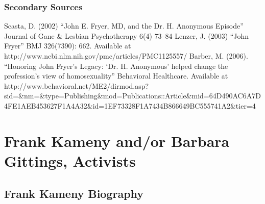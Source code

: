 \subsection{Secondary Sources}
\label{secondarysources}

Scasta, D. (2002) “John E. Fryer, MD, and the Dr. H. Anonymous Episode” Journal of Gane \& Lesbian Psychotherapy 6(4) 73--84
Lenzer, J. (2003) “John Fryer” BMJ 326(7390): 662. Available at http:\slash \slash www.ncbi.nlm.nih.gov\slash pmc\slash articles\slash PMC1125557\slash 
Barber, M. (2006). “Honoring John Fryer's Legacy: `Dr. H. Anonymous' helped change the profession's view of homosexuality” Behavioral Healthcare. Available at http:\slash \slash www.behavioral.net\slash ME2\slash dirmod.asp?sid=\&nm=\&type=Publishing\&mod=Publications::Article\&mid=64D490AC6A7D4FE1AEB453627F1A4A32\&id=1EF73328F1A7434B866649BC555741A2\&tier=4

\chapter{Frank Kameny and\slash or Barbara Gittings, Activists}
\label{frankkamenyandorbarbaragittingsactivists}

\section{Frank Kameny Biography}
\label{frankkamenybiography}

